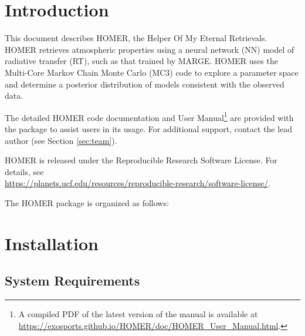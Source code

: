 \documentclass[letterpaper, 12pt]{article}
\begin{document}
\section{Introduction}
\label{sec:theory}

\noindent This document describes HOMER, the Helper Of My Eternal Retrievals.
HOMER retrieves atmospheric properties using a neural network (NN) model of 
radiative transfer (RT), such as that trained by MARGE.  HOMER uses the 
Multi-Core Markov Chain Monte Carlo (MC3) code to explore a parameter space 
and determine a posterior distribution of models consistent with the observed 
data.

The detailed HOMER code documentation and User Manual\footnote{A compiled PDF 
of the latest version of the manual is available at 
\href{https://exosports.github.io/HOMER/doc/HOMER_User_Manual.html}{https://exosports.github.io/HOMER/doc/HOMER_User_Manual.html}.} 
are provided with the package to assist users in its usage. 
For additional support, contact the lead author (see Section \ref{sec:team}).

HOMER is released under the Reproducible Research Software License.  
For details, see \\
\href{https://planets.ucf.edu/resources/reproducible-research/software-license/}{https://planets.ucf.edu/resources/reproducible-research/software-license/}.
\newline

\noindent The HOMER package is organized as follows: \newline
\noindent{}
\vspace{0.7cm}

\section{Installation}
\label{sec:installation}

\subsection{System Requirements}
\label{sec:requirements}
\end{document}
